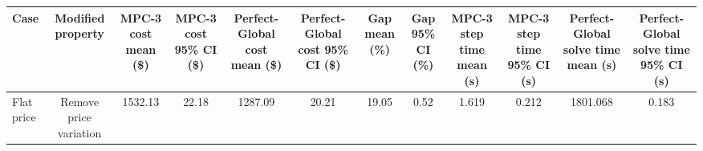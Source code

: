 \begin{tabular}{lccccccccccc}
\toprule
Case & Modified property & MPC-3 cost mean (\$) & MPC-3 cost 95\% CI (\$) & Perfect-Global cost mean (\$) & Perfect-Global cost 95\% CI (\$) & Gap mean (\%) & Gap 95\% CI (\%) & MPC-3 step time mean (s) & MPC-3 step time 95\% CI (s) & Perfect-Global solve time mean (s) & Perfect-Global solve time 95\% CI (s) \\
\midrule
Flat price & Remove price variation & 1532.13 & 22.18 & 1287.09 & 20.21 & 19.05 & 0.52 & 1.619 & 0.212 & 1801.068 & 0.183 \\
\bottomrule
\end{tabular}
